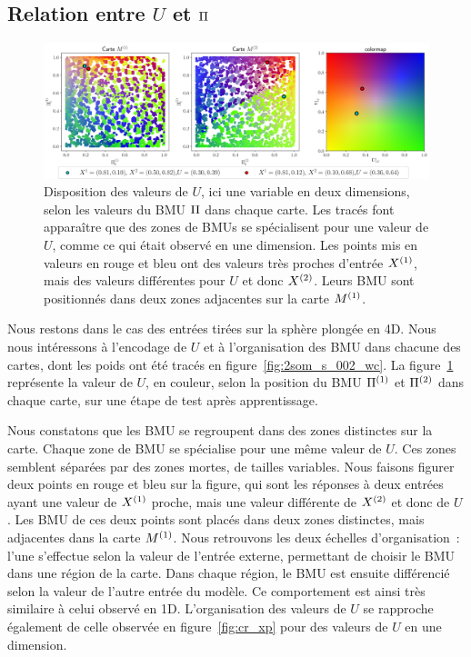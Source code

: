 \documentclass[../main]{subfiles}
\begin{document}
\subsection{Relation entre $U$ et $\Pi$ \label{par:U_bmu2D}}

\begin{figure}[t]
	\includegraphics[width=\textwidth]{U_BMU_2SOM_2D.png}
	\caption{Disposition des valeurs de $U$, ici une variable en deux dimensions, selon les valeurs du BMU $\Pi$ dans chaque carte. Les tracés font apparaître que des zones de BMUs se spécialisent pour une valeur de $U$, comme ce qui était observé en une dimension. Les points mis en valeurs en rouge et bleu ont des valeurs très proches d'entrée $X^{({1})}$, mais des valeurs différentes pour $U$ et donc $X^{({2})}$. Leurs BMU sont positionnés dans deux zones adjacentes sur la carte $M^{({1})}$.
	\label{fig:U_BMU}}
\end{figure}

Nous restons dans le cas des entrées tirées sur la sphère plongée en 4D. 
Nous nous intéressons à l'encodage de $U$ et à l'organisation des BMU dans chacune des cartes, dont les poids ont été tracés en figure~\ref{fig:2som_s_002_wc}.
La figure~\ref{fig:U_BMU} représente la valeur de $U$, en couleur, selon la position du BMU $\Pi^{({1})}$ et $\Pi^{({2})}$ dans chaque carte, sur une étape de test après apprentissage.

Nous constatons que les BMU se regroupent dans des zones distinctes sur la carte. Chaque zone de BMU se spécialise pour une même valeur de $U$. Ces zones semblent séparées par des zones mortes, de tailles variables.
Nous faisons figurer deux points en rouge et bleu sur la figure, qui sont les réponses à deux entrées ayant une valeur de $X^{({1})}$ proche, mais une valeur différente de $X^{({2})}$ et donc de $U$.
Les BMU de ces deux points sont placés dans deux zones distinctes, mais adjacentes dans la carte $M^{({1})}$. Nous retrouvons les deux échelles d'organisation~: l'une s'effectue selon la valeur de l'entrée externe, permettant de choisir le BMU dans une région de la carte. Dans chaque région, le BMU est ensuite différencié selon la valeur de l'autre entrée du modèle.
Ce comportement est ainsi très similaire à celui observé en 1D.
L'organisation des valeurs de $U$ se rapproche également de celle observée en figure~\ref{fig:cr_xp} pour des valeurs de $U$ en une dimension.
\end{document}
